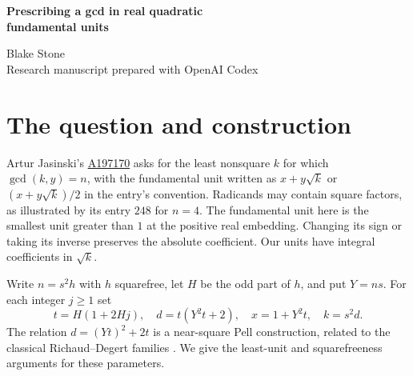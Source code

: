 \documentclass[11pt,letterpaper]{article}
\newcommand{\oeis}[1]{\href{https://oeis.org/A#1}{A#1}}
\begin{document}
\thispagestyle{plain}
\begin{center}
{\LARGE\bfseries Prescribing a gcd in real quadratic\\[0.12em] fundamental units\par}
\vspace{0.5em}
Blake Stone\\
{\small Research manuscript prepared with OpenAI Codex}
\end{center}

\begin{abstract}
Given any $n\ge1$, we construct infinitely many distinct real quadratic fields with a radicand $k$ for which the coefficient of $\sqrt{k}$ in the fundamental unit is exactly $n$ and $n\mid k$. This proves the existence conjecture for OEIS \oeis{197170} and the infinitude conjecture for \oeis{197171}. If $s^2$ is the largest square dividing $n$, the construction attains the least possible square multiplier $s$ in $\sqrt{k}=s\sqrt d$, $d$ squarefree. It gives a witness $k<10^6 n^{14}$.
\end{abstract}

\section{The question and construction}
Artur Jasinski's \oeis{197170} asks for the least nonsquare $k$ for which $\gcd(k,y)=n$, with the fundamental unit written as $x+y\sqrt{k}$ or $(x+y\sqrt{k})/2$ in the entry's convention. Radicands may contain square factors, as illustrated by its entry $248$ for $n=4$. The fundamental unit here is the smallest unit greater than $1$ at the positive real embedding. Changing its sign or taking its inverse preserves the absolute coefficient. Our units have integral coefficients in $\sqrt{k}$.

Write $n=s^2h$ with $h$ squarefree, let $H$ be the odd part of $h$, and put $Y=ns$. For each integer $j\ge1$ set
\begin{equation}\label{eq:family}
 t=H(1+2Hj),\quad d=t(Y^2t+2),\quad x=1+Y^2t,\quad k=s^2d .
\end{equation}
The relation $d=(Yt)^2+2t$ is a near-square Pell construction, related to the classical Richaud--Degert families \cite{yokoi}. We give the least-unit and squarefreeness arguments for these parameters.
\end{document}
